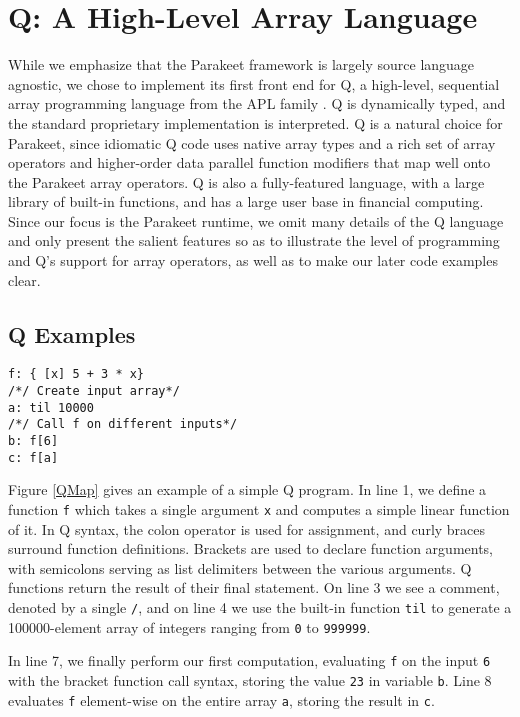 \documentclass[preprint]{sigplanconf}
\begin{document}
\section{Q: A High-Level Array Language}
\label{Q}

While we emphasize that the Parakeet framework is largely source language
agnostic, we chose to implement its first front end for Q, a high-level,
sequential array programming language from the APL family \cite{Borr08}.
Q is dynamically typed, and the standard proprietary implementation is
interpreted. Q is a natural choice for Parakeet, since idiomatic Q code uses
native array types and a rich set of array operators and higher-order
data parallel function modifiers that map well onto the Parakeet array
operators. Q is also a fully-featured language, with a large library of built-in
functions, and has a large user base in financial computing. Since our
focus is the Parakeet runtime, we omit many details of the Q language and only
present the salient features so as to illustrate the level of programming
and Q's support for array operators, as well as to make our later code examples
clear.


\subsection{Q Examples}

\begin{lstlisting}[caption=Q Map Example]
f: { [x] 5 + 3 * x}
/*/ Create input array*/
a: til 10000
/*/ Call f on different inputs*/
b: f[6]
c: f[a]
\end{lstlisting}
\label{QMap}

Figure \ref{QMap} gives an example of a simple Q program.  In line 1, we define
a function \texttt{f} which takes a single argument \texttt{x} and computes a
simple linear function of it.  In Q syntax, the colon operator is used for
assignment, and curly braces surround function definitions.  Brackets are used
to declare function arguments, with semicolons serving as list delimiters
between the various arguments.  Q functions return the result of their final
statement.  On line 3 we see a comment, denoted by a single \texttt{/}, and on
line 4 we use the built-in function \texttt{til} to generate a
100000-element array of integers ranging from \texttt{0} to \texttt{999999}.

In line 7, we finally perform our first computation, evaluating \texttt{f} on
the input \texttt{6} with the bracket function call syntax, storing the
value \texttt{23} in variable \texttt{b}.  Line 8 evaluates \texttt{f}
element-wise on the entire array \texttt{a}, storing the result in \texttt{c}.
\end{document}
